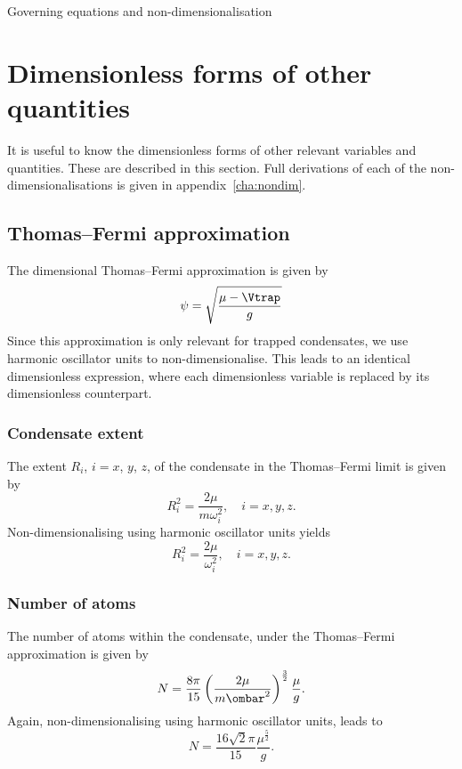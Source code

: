 \begin{chapter}{\label{cha:equations}Governing equations and
  non-dimensionalisation}
  \section{Dimensionless forms of other quantities}
  It is useful to know the dimensionless forms of other relevant variables and
  quantities.  These are described in this section.  Full derivations of each
  of the non-dimensionalisations is given in appendix~\ref{cha:nondim}.

  \subsection{Thomas--Fermi approximation}
  The dimensional Thomas--Fermi approximation is given by
  \begin{equation*}
    \psi = \sqrt{\frac{\mu-\Vtrap}{g}}
  \end{equation*}
  Since this approximation is only relevant for trapped condensates, we use
  harmonic oscillator units to non-dimensionalise.  This leads to an identical
  dimensionless expression, where each dimensionless variable is replaced by
  its dimensionless counterpart.

  \subsubsection{Condensate extent}
  The extent $R_{i}$, $i = x$, $y$, $z$, of the condensate in the Thomas--Fermi
  limit is given by
  \begin{equation*}
    R_{i}^{2} = \frac{2\mu}{m\omega_{i}^{2}}, \quad i = x, y, z.
  \end{equation*}
  Non-dimensionalising using harmonic oscillator units yields
  \begin{equation*}
    R_{i}^{2} = \frac{2\mu}{\omega_{i}^{2}}, \quad i = x, y, z.
  \end{equation*}

  \subsubsection{Number of atoms}
  The number of atoms within the condensate, under the Thomas--Fermi
  approximation is given by
  \begin{equation*}
    N = \frac{8\pi}{15} \left( \frac{2\mu}{m\ombar^2} \right)^{\frac{3}{2}}
    \frac{\mu}{g}.
  \end{equation*}
  Again, non-dimensionalising using harmonic oscillator units, leads to
  \begin{equation*}
    N = \frac{16\sqrt{2}\pi}{15} \frac{\mu^{\frac{5}{2}}}{g}.
  \end{equation*}


\end{chapter}

